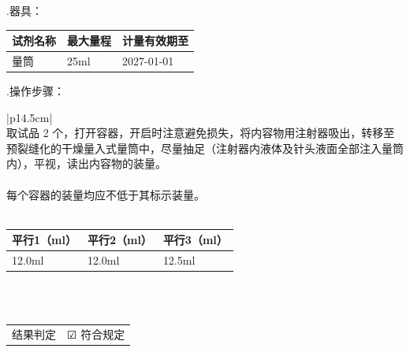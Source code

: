 \documentclass[UTF8,10pt,a4paper,fontset=fandol]{ctexart}
\newcommand{\fieldvalue}[1]{#1}
\newcommand{\handwritten}[1]{#1}
\newcommand{\checkboxfield}[1]{\ifstrequal{#1}{checked}{☑}{\ifstrequal{#1}{unclear}{?}{☐}}}
\begin{document}
.\quad 器具：

\begin{center}
\begin{tabular}{|p{3.5cm}|p{5.5cm}|p{5.5cm}|}
\hline
\textbf{试剂名称} & \textbf{最大量程} & \textbf{计量有效期至} \\
\hline
量筒 &
\fieldvalue{\handwritten{25ml}} &
\fieldvalue{\handwritten{2027-01-01}} \\
\hline
\end{tabular}
\end{center}

.\quad 操作步骤：

\begin{center}
\begin{tabular}{|p{14.5cm}|}
\hline
{}\\
\hline
取试品
\fieldvalue{\handwritten{2}} 个，打开容器，开启时注意避免损失，将内容物用注射器吸出，转移至预裂缝化的干燥量入式量筒中，尽量抽足（注射器内液体及针头液面全部注入量筒内），平视，读出内容物的装量。\\
\hline
{}\\
\hline
每个容器的装量均应不低于其标示装量。\\
\hline
{}\\
\hline
\begin{tabular}{|p{4.7cm}|p{4.7cm}|p{4.7cm}|}
\hline
平行1（ml） & 平行2（ml） & 平行3（ml）\\
\hline
\fieldvalue{\handwritten{12.0ml}} &
\fieldvalue{\handwritten{12.0ml}} &
\fieldvalue{\handwritten{12.5ml}}\\
\hline
\end{tabular}\\
\hline
{}\\
\hline
\begin{tabular}{@{}ll@{}}
结果判定 &
\fieldvalue{\checkboxfield{checked}} 符合规定
\hspace{1.5cm}%

\end{tabular}
\end{tabular}
\end{center}
\end{document}
